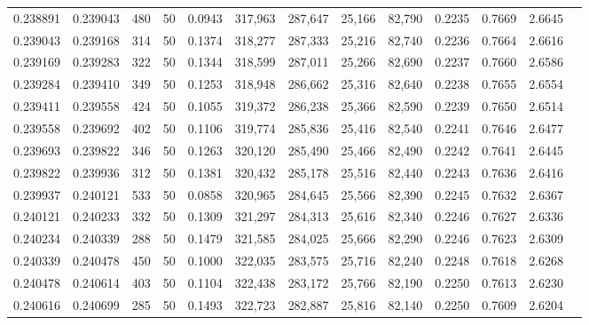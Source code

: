 \begin{tabular}{rrrrrrrrrrrrr}
0.238891 & 0.239043 &   480 &  50 &                                     0.0943 & 317,963 & 287,647 &  25,166 &  82,790 & 0.2235 & 0.7669 & 2.6645 \\
0.239043 & 0.239168 &   314 &  50 &                                     0.1374 & 318,277 & 287,333 &  25,216 &  82,740 & 0.2236 & 0.7664 & 2.6616 \\
0.239169 & 0.239283 &   322 &  50 &                                     0.1344 & 318,599 & 287,011 &  25,266 &  82,690 & 0.2237 & 0.7660 & 2.6586 \\
0.239284 & 0.239410 &   349 &  50 &                                     0.1253 & 318,948 & 286,662 &  25,316 &  82,640 & 0.2238 & 0.7655 & 2.6554 \\
0.239411 & 0.239558 &   424 &  50 &                                     0.1055 & 319,372 & 286,238 &  25,366 &  82,590 & 0.2239 & 0.7650 & 2.6514 \\
0.239558 & 0.239692 &   402 &  50 &                                     0.1106 & 319,774 & 285,836 &  25,416 &  82,540 & 0.2241 & 0.7646 & 2.6477 \\
0.239693 & 0.239822 &   346 &  50 &                                     0.1263 & 320,120 & 285,490 &  25,466 &  82,490 & 0.2242 & 0.7641 & 2.6445 \\
0.239822 & 0.239936 &   312 &  50 &                                     0.1381 & 320,432 & 285,178 &  25,516 &  82,440 & 0.2243 & 0.7636 & 2.6416 \\
0.239937 & 0.240121 &   533 &  50 &                                     0.0858 & 320,965 & 284,645 &  25,566 &  82,390 & 0.2245 & 0.7632 & 2.6367 \\
0.240121 & 0.240233 &   332 &  50 &                                     0.1309 & 321,297 & 284,313 &  25,616 &  82,340 & 0.2246 & 0.7627 & 2.6336 \\
0.240234 & 0.240339 &   288 &  50 &                                     0.1479 & 321,585 & 284,025 &  25,666 &  82,290 & 0.2246 & 0.7623 & 2.6309 \\
0.240339 & 0.240478 &   450 &  50 &                                     0.1000 & 322,035 & 283,575 &  25,716 &  82,240 & 0.2248 & 0.7618 & 2.6268 \\
0.240478 & 0.240614 &   403 &  50 &                                     0.1104 & 322,438 & 283,172 &  25,766 &  82,190 & 0.2250 & 0.7613 & 2.6230 \\
0.240616 & 0.240699 &   285 &  50 &                                     0.1493 & 322,723 & 282,887 &  25,816 &  82,140 & 0.2250 & 0.7609 & 2.6204 \\

\end{tabular}
